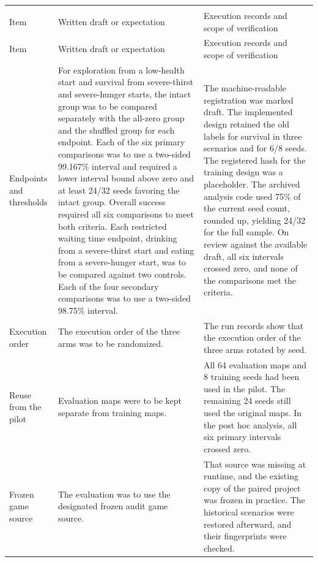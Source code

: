 \documentclass{article}
\begin{document}
\begingroup\small\setlength{\tabcolsep}{3pt}
\begin{longtable}{>{\raggedright\arraybackslash}p{}>{\raggedright\arraybackslash}p{}>{\raggedright\arraybackslash}p{}}
\multicolumn{3}{@{}p{\linewidth}@{}}{\raggedright\normalsize Written registration and actual execution of the adverse-start trials} \\* [3pt]
\toprule
Item & Written draft or expectation & Execution records and scope of verification \\
\midrule\endfirsthead
\toprule
Item & Written draft or expectation & Execution records and scope of verification \\
\midrule\endhead
\bottomrule\endfoot
Endpoints and thresholds & For exploration from a low-health start and survival from severe-thirst and severe-hunger starts, the intact group was to be compared separately with the all-zero group and the shuffled group for each endpoint. Each of the six primary comparisons was to use a two-sided 99.167\% interval and required a lower interval bound above zero and at least 24/32 seeds favoring the intact group. Overall success required all six comparisons to meet both criteria. Each restricted waiting time endpoint, drinking from a severe-thirst start and eating from a severe-hunger start, was to be compared against two controls. Each of the four secondary comparisons was to use a two-sided 98.75\% interval. & The machine-readable registration was marked draft. The implemented design retained the old labels for survival in three scenarios and for 6/8 seeds. The registered hash for the training design was a placeholder. The archived analysis code used 75\% of the current seed count, rounded up, yielding 24/32 for the full sample. On review against the available draft, all six intervals crossed zero, and none of the comparisons met the criteria. \\
Execution order & The execution order of the three arms was to be randomized. & The run records show that the execution order of the three arms rotated by seed. \\
Reuse from the pilot & Evaluation maps were to be kept separate from training maps. & All 64 evaluation maps and 8 training seeds had been used in the pilot. The remaining 24 seeds still used the original maps. In the post hoc analysis, all six primary intervals crossed zero. \\
Frozen game source & The evaluation was to use the designated frozen audit game source. & That source was missing at runtime, and the existing copy of the paired project was frozen in practice. The historical scenarios were restored afterward, and their fingerprints were checked. \\

\end{longtable}
\end{document}
